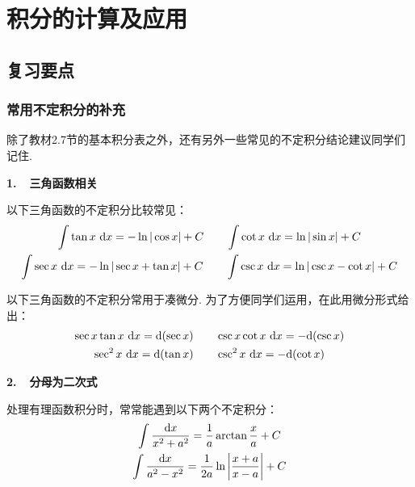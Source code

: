 \clearpage
\section{积分的计算及应用}

\subsection{复习要点} \par

\subsubsection{常用不定积分的补充}\par

除了教材2.7节的基本积分表之外，还有另外一些常见的不定积分结论建议同学们记住.\vspace{0.5em}

\textbf{1.~~三角函数相关}\vspace{0.25em}

以下三角函数的不定积分比较常见：
\begin{gather*}
    \setlength\abovedisplayskip{6pt}
    \setlength\belowdisplayskip{6pt}
    \int \tan x~\d x = -\ln |\cos x|+C~~~~~~\int \cot x~\d x = \ln |\sin x|+C \\
    \int \sec x~\d x = -\ln |\sec x + \tan x|+C~~~~~~\int \csc x~\d x =\ln |\csc x - \cot x|+C
    \nonumber
\end{gather*}\par
以下三角函数的不定积分常用于凑微分. 为了方便同学们运用，在此用微分形式给出：
\begin{gather*}
    \setlength\abovedisplayskip{6pt}
    \setlength\belowdisplayskip{6pt}
    \sec x \tan x~\d x = \d (\sec x)~~~~~~\csc x \cot x~\d x= -\d (\csc x) \\
    \sec^2x~\d x = \d (\tan x)~~~~~~\csc^2x~\d x = -\d (\cot x)
    \nonumber
\end{gather*}\par
\textbf{2.~~分母为二次式}\vspace{0.25em}

处理有理函数积分时，常常能遇到以下两个不定积分：
\begin{gather*}
    \int \frac{\mathrm{d} x}{x^2+a^2} = \frac{1}{a} \arctan \frac{x}{a}+C  \\
    \int \frac{\mathrm{d} x}{a^2-x^2} = \frac{1}{2a} \ln \left| \frac{x+a}{x-a} \right|  +C
    \nonumber
\end{gather*}


